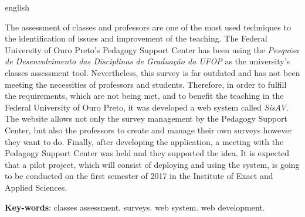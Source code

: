 \documentclass[
  12pt,       %
  openright,      %
  oneside,      %
  a4paper,      %
  english,      %
  french,        %
  spanish,     %
  brazil        %
  ]{abntex2-decsi}
\begin{document}
\begin{resumo}[Abstract]
 \begin{otherlanguage*}{english}
   
   The assessment of classes and professors are one of the most used techniques to the identification of issues and improvement of the teaching. The Federal University of Ouro Preto's Pedagogy Support Center has been using the \textit{Pesquisa de Desenvolvimento das Disciplinas de Graduação da UFOP} as the university's classes assessment tool. Nevertheless, this survey is far outdated and has not been meeting the necessities of professors and students. Therefore, in order to fulfill the requirements, which are not being met, and to benefit the teaching in the Federal University of Ouro Preto, it was developed a web system called \textit{SisAV}. The website allows not only the survey management by the Pedagogy Support Center, but also the professors to create and manage their own surveys however they want to do. Finally, after developing the application, a meeting with the Pedagogy Support Center was held and they supported the idea. It is expected that a pilot project, which will consist of deploying and using the system, is going to be conducted on the first semester of 2017 in the Institute of Exact and Applied Sciences.
   
   \vspace{\onelineskip}
   \noindent
   \textbf{Key-words}: classes assessment. surveys. web system. web development.
 \end{otherlanguage*}
\end{resumo}

\listoffigures*
\cleardoublepage

\listoftables*
\cleardoublepage
\end{document}
